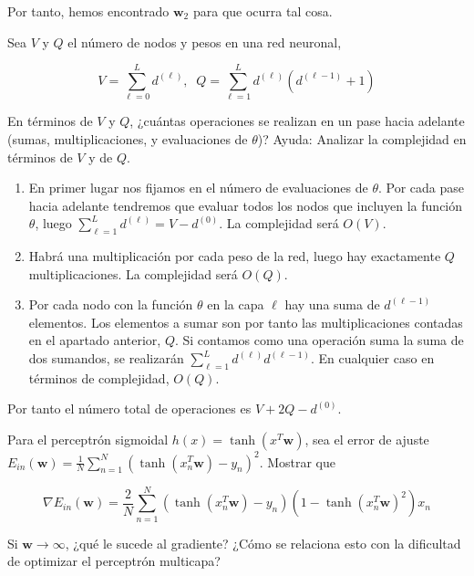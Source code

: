 \documentclass[11pt,leqno]{article}
\theoremstyle{definition}
\begin{document}
  Por tanto, hemos encontrado $\mathbf{w}_2$ para que ocurra tal cosa.
  
  \begin{cuestion}
    Sea $V$ y $Q$ el número de nodos y pesos en una red neuronal,

    $$ V = \sum_{\ell=0}^L d^{(\ell)}, \; \; Q = \sum_{\ell=1}^L d^{(\ell)} \left( d^{(\ell-1)} + 1\right) $$

    En términos de $V$ y $Q$, ¿cuántas operaciones se realizan en un pase hacia adelante (sumas, multiplicaciones, y evaluaciones de $\theta$)? Ayuda: Analizar la complejidad en términos de $V$ y de $Q$.
  \end{cuestion}

  \begin{solucion}
  		\begin{enumerate}
	\item	En primer lugar nos fijamos en el número de evaluaciones de $\theta$. Por cada pase hacia adelante tendremos que evaluar todos los nodos que incluyen la función $\theta$, luego $\sum\limits_{\ell=1}^L d^{(\ell)} = V-d^{(0)}$. La complejidad será $O(V)$.
	\item Habrá una multiplicación por cada peso de la red, luego hay exactamente $Q$ multiplicaciones. La complejidad será $O(Q)$.
	\item Por cada nodo con la función $\theta$ en la capa $\ell$ hay una suma de $d^{(\ell-1)}$ elementos. Los elementos a sumar son por tanto las multiplicaciones contadas en el apartado anterior, $Q$. Si contamos como una operación suma la suma de dos sumandos, se realizarán  $\sum_{\ell=1}^L d^{(\ell)} d^{(\ell-1)}$. En cualquier caso en términos de complejidad, $O(Q)$. 
	\end{enumerate}
	Por tanto el número total de operaciones es $V+2Q-d^{(0)}$.
  \end{solucion}

  \begin{cuestion}
    Para el perceptrón sigmoidal $h(x) = \tanh(x^T\mathbf{w})$, sea el error de ajuste $E_{in}(\mathbf{w}) = \frac{1}{N}\sum\limits_{n=1}^N \left( \tanh(x_n^T\mathbf{w}) - y_n \right)^2$. Mostrar que

    \[ \nabla E_{in}(\mathbf{w}) = \frac{2}{N} \sum_{n=1}^N \left(  \tanh(x_n^T\mathbf{w}) - y_n \right) \left( 1 - \tanh(x_n^T\mathbf{w})^2 \right) x_n \]

    Si $\mathbf{w} \rightarrow \infty$, ¿qué le sucede al gradiente? ¿Cómo se relaciona esto con la dificultad de optimizar el perceptrón multicapa?

  \end{cuestion}
\end{document}
